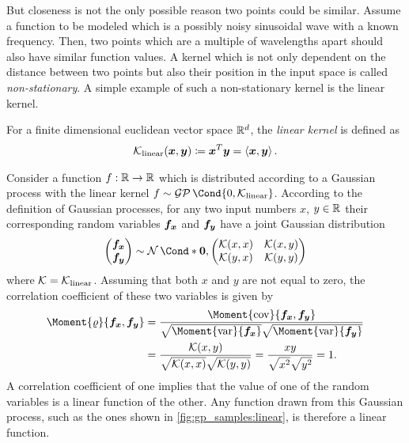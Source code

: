 But closeness is not the only possible reason two points could be similar.
Assume a function to be modeled which is a possibly noisy sinusoidal wave with a known frequency.
Then, two points which are a multiple of wavelengths apart should also have similar function values.
A kernel which is not only dependent on the distance between two points but also their position in the input space is called \emph{non-stationary}.
A simple example of such a non-stationary kernel is the linear kernel.
\begin{definition}
    For a finite dimensional euclidean vector space $\mathbb{R}^d$, the \emph{linear kernel} is defined as
    \begin{align}
        \operatorname{\mathcal{K}}_{\text{linear}}(\bm{x}, \bm{y}) \coloneqq \bm{x}^T \bm{y} = \left\langle \bm{x}, \bm{y}\right\rangle.
    \end{align}
\end{definition}
Consider a function $f : \mathbb{R} \to \mathbb{R}$ which is distributed according to a Gaussian process with the linear kernel $f \sim \GP\Cond{0, \K_{\text{linear}}}$.
According to the definition of Gaussian processes, for any two input numbers $x$, $y \in \mathbb{R}$ their corresponding random variables $\bm{f_x}$ and $\bm{f_y}$ have a joint Gaussian distribution
\begin{align}
    \begin{pmatrix}
        \rv{f_x} \\ \rv{f_y}
    \end{pmatrix} \sim \Gaussian*{\mat{0}, \begin{pmatrix}
        \K(x, x) & \K(x, y) \\
        \K(y, x) & \K(y, y)
    \end{pmatrix}}
\end{align}
where $\operatorname{\mathcal{K}} = \operatorname{\mathcal{K}}_{\text{linear}}$.
Assuming that both $x$ and $y$ are not equal to zero, the correlation coefficient of these two variables is given by
\begin{align}
    \Moment{\corr}{\rv{f_x}, \rv{f_y}} &= \frac{\Moment{\cov}{\rv{f_x}, \rv{f_y}}}{\sqrt{\Moment{\var}{\rv{f_x}\vphantom{\rv{f_y}}}}\sqrt{\Moment{\var}{\rv{f_y}}}} \\
    &= \frac{\K(x, y)}{\sqrt{\K(x, x)} \sqrt{\K(y, y)}} = \frac{xy}{\sqrt{\vphantom{y^2}x^2}\sqrt{\vphantom{y^2}y^2}} = 1.
\end{align}
A correlation coefficient of one implies that the value of one of the random variables is a linear function of the other.
Any function drawn from this Gaussian process, such as the ones shown in \cref{fig:gp_samples:linear}, is therefore a linear function.
